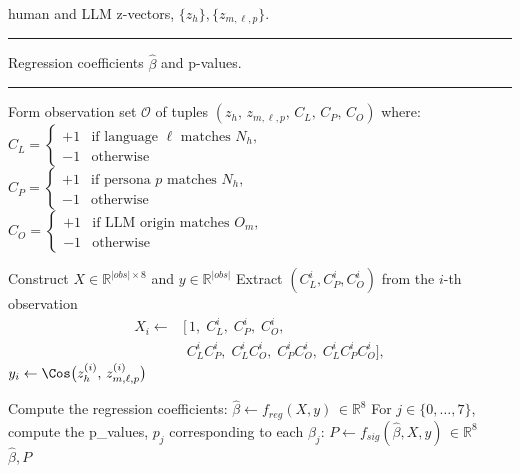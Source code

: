 \begin{algorithmic}[1]
  \Require human and LLM z-vectors, $\{z_h\}, \{z_{m,\ell,p}\}$. 
\vspace{0.5em}\hrule\vspace{0.5em}
  \Ensure Regression coefficients $\hat\beta$ and p-values.
\vspace{0.5em}\hrule\vspace{0.5em}
  \State Form observation set $\mathcal{O}$ of tuples 
         $(z_h,\,z_{m,\ell,p},\,C_L,\,C_P,\,C_O)$ where:
  \State $C_L = 
    \begin{cases}
      +1 & \text{if language }\ell\text{ matches }N_h,\\
      -1 & \text{otherwise}
    \end{cases}$
  \State $C_P = 
    \begin{cases}
      +1 & \text{if persona }p\text{ matches }N_h,\\
      -1 & \text{otherwise}
    \end{cases}$
  \State $C_O = 
    \begin{cases}
      +1 & \text{if LLM origin matches }O_m,\\
      -1 & \text{otherwise}
    \end{cases}$

  \State Construct $X\in\mathbb{R}^{|obs|\times 8}$ and 
         $y\in\mathbb{R}^{|obs|}$
    \State Extract $(C_L^i,C_P^i,C_O^i)$ from the $i$-th observation
    \vspace{-0.75em}
    \[
    \begin{split}
      X_i \leftarrow 
      &\bigl[\,1,\;C_L^i,\;C_P^i,\;C_O^i,\\
&\;C_L^iC_P^i,\;C_L^iC_O^i,\;C_P^iC_O^i,\;C_L^iC_P^iC_O^i\bigr],
      \end{split}
    \] $y_i \leftarrow \Cos\bigl(z_h^{(i)},\,z_{m,\ell,p}^{(i)}\bigr)$
    \vspace{0.5em}
  \EndFor

  \State Compute the regression coefficients: 
  $\hat\beta \gets f_{reg}(X,y)\,\in\mathbb{R}^8$ 
  \State For $j∈\{0,…,7\}$, compute the p\_values, $p_j$ corresponding to each $\beta_j$:
  $P \gets f_{sig}(\hat\beta,X,y)\,\in\mathbb{R}^8$\\
\Return $\hat{\beta},P$


\end{algorithmic}
